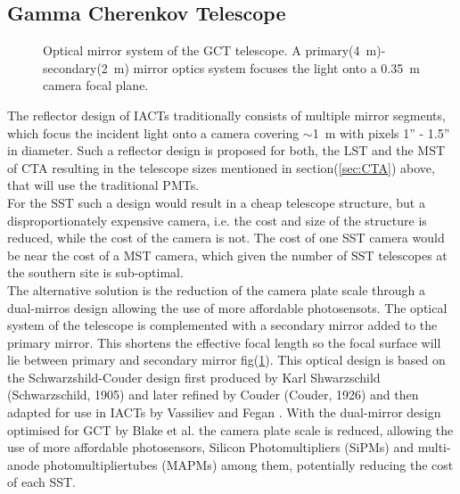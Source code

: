 \documentclass[12pt,article,type=msc,colorback,accentcolor=tud9c]{tudthesis}
\begin{document}
\subsection{Gamma Cherenkov Telescope}
\begin{figure}[b!]
\begin{centering}
\caption[GCT optical system]{Optical mirror system of the GCT telescope. A primary(4~m)-secondary(2~m) mirror optics system focuses the light onto a 0.35~m camera focal plane.}
\label{fig:GCT_Focal}
\end{centering}
\end{figure}
The reflector design of IACTs traditionally consists of multiple mirror segments, which focus the incident light onto a camera covering $\sim$1~m with pixels 1'' - 1.5'' in diameter. Such a reflector design is proposed for both, the LST and the MST of CTA resulting in the telescope sizes mentioned in section(\ref{sec:CTA}) above, that will use the traditional PMTs.\\
For the SST such a design would result in a cheap telescope structure, but a disproportionately expensive camera, i.e. the cost and size of the structure is reduced, while the cost of the camera is not. The cost of one SST camera would be near the cost of a MST camera, which given the number of SST telescopes at the southern site is sub-optimal.\\
The alternative solution is the reduction of the camera plate scale through a dual-mirros design allowing the use of more affordable photosensots. The optical system of the telescope is complemented with a secondary mirror added to the primary mirror. This shortens the effective focal length so the focal surface will lie between primary and secondary mirror fig(\ref{fig:GCT_Focal}). This optical design is based on the Schwarzshild-Couder design first produced by Karl Shwarzschild (Schwarzschild, 1905) and later refined by Couder (Couder, 1926) and then adapted for use in IACTs by Vassiliev and Fegan \cite{FeganVassiliev}. With the dual-mirror design optimised for GCT by Blake et al. \cite{SSTGATE} the camera plate scale is reduced, allowing the use of more affordable photosensors, Silicon Photomultipliers (SiPMs) and multi-anode photomultipliertubes (MAPMs) among them, potentially reducing the cost of each SST.
\end{document}
